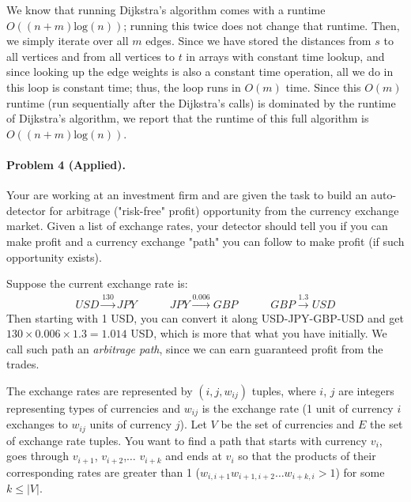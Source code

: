 \documentclass[11pt]{article}
\begin{document}
We know that running Dijkstra's algorithm comes with a runtime $O((n + m)\text{log}(n))$; running this twice does not change that runtime. Then, we simply iterate over all $m$ edges. Since we have stored the distances from $s$ to all vertices and from all vertices to $t$ in arrays with constant time lookup, and since looking up the edge weights is also a constant time operation, all we do in this loop is constant time; thus, the loop runs in $O(m)$ time. Since this $O(m)$ runtime (run sequentially after the Dijkstra's calls) is dominated by the runtime of Dijkstra's algorithm, we report that the runtime of this full algorithm is $O((n + m)\text{log}(n))$.


\newpage
\paragraph{Problem 4 (Applied).}  Your are working at an investment firm and are given the task to build an auto-detector for arbitrage ("risk-free" profit) opportunity from the currency exchange market. Given a list of exchange rates, your detector should tell you if you can make profit and a currency exchange "path" you can follow to make profit (if such opportunity exists).

Suppose the current exchange rate is:
\begin{align*}
    USD\xrightarrow{130}JPY\hspace{3em}
    JPY\xrightarrow{0.006}GBP\hspace{3em}
    GBP\xrightarrow{1.3}USD
\end{align*}
Then starting with 1 USD, you can convert it along USD-JPY-GBP-USD and get $130\times 0.006\times 1.3=1.014$ USD, which is more that what you have initially. We call such path an \textit{arbitrage path}, since we can earn guaranteed profit from the trades. 

The exchange rates are represented by $(i,j,w_{ij})$ tuples, where $i$, $j$ are integers representing types of currencies and $w_{ij}$ is the exchange rate (1 unit of currency $i$ exchanges to $w_{ij}$ units of currency $j$). Let $V$ be the set of currencies and $E$ the set of exchange rate tuples. You want to find a path that starts with currency $v_i$, goes through $v_{i+1}$, $v_{i+2}$,$\dots$ $v_{i+k}$ and ends at $v_i$ so that the products of their corresponding rates are greater than 1 ($w_{i,i+1}w_{i+1,i+2}\dots w_{i+k,i}> 1$) for some $k\leq|V|$. 
\end{document}
